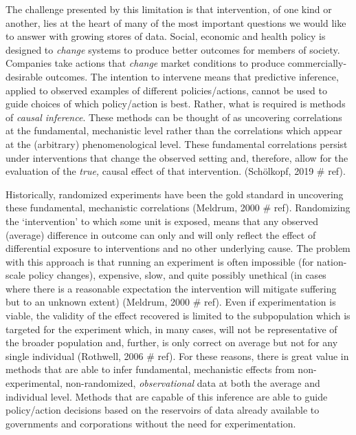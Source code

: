 \documentclass[../main.tex]{subfiles}
\begin{document}
\vspace{\baselineskip}
The challenge presented by this limitation is that intervention, of one kind or another, lies at the heart of many of the most important questions we would like to answer with growing stores of data. Social, economic and health policy is designed to \textit{change} systems to produce better outcomes for members of society. Companies take actions that \textit{change} market conditions to produce commercially-desirable outcomes. The intention to intervene means that predictive inference, applied to observed examples of different policies/actions, cannot be used to guide choices of which policy/action is best. Rather, what is required is methods of \textit{causal inference}. These methods can be thought of as uncovering correlations at the fundamental, mechanistic level rather than the correlations which appear at the (arbitrary) phenomenological level. These fundamental correlations persist under interventions that change the observed setting and, therefore, allow for the evaluation of the \textit{true, }causal\textit{ }effect of that intervention. (Schölkopf, 2019 $\#$ ref).\par


\vspace{\baselineskip}
Historically, randomized experiments have been the gold standard in uncovering these fundamental, mechanistic correlations (Meldrum, 2000 $\#$ ref). Randomizing the ‘intervention’ to which some unit is exposed, means that any observed (average) difference in outcome can only and will only reflect the effect of differential exposure to interventions and no other underlying cause. The problem with this approach is that running an experiment is often impossible (for nation-scale policy changes), expensive, slow, and quite possibly unethical (in cases where there is a reasonable expectation the intervention will mitigate suffering but to an unknown extent) (Meldrum, 2000 $\#$ ref). Even if experimentation is viable, the validity of the effect recovered is limited to the subpopulation which is targeted for the experiment which, in many cases, will not be representative of the broader population and, further, is only correct on average but not for any single individual (Rothwell, 2006 $\#$ ref). For these reasons, there is great value in methods that are able to infer fundamental, mechanistic effects from non-experimental, non-randomized, \textit{observational} data at both the average and individual level. Methods that are capable of this inference are able to guide policy/action decisions based on the reservoirs of data already available to governments and corporations without the need for experimentation.\par
\end{document}
